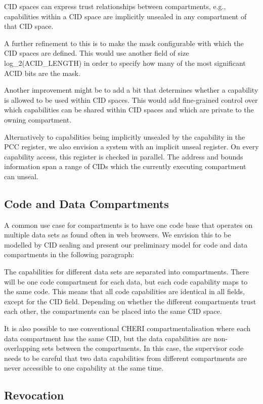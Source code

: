 CID spaces can express trust relationships between compartments, e.g., capabilities within a CID space are implicitly unsealed in any compartment of that CID space.

A further refinement to this is to make the mask configurable with which the CID spaces are defined.
This would use another field of size log\_2(ACID\_LENGTH) in order to specify how many of the most significant ACID bits are the mask.

Another improvement might be to add a bit that determines whether a capability is allowed to be used within CID spaces.
This would add fine-grained control over which capabilities can be shared within CID spaces and which are private to the owning compartment.

Alternatively to capabilities being implicitly unsealed by the capability in the PCC register, we also envision a system with an implicit unseal register.
On every capability access, this register is checked in parallel.
The address and bounds information span a range of CIDs which the currently executing compartment can unseal.

\subsection{Code and Data Compartments}

A common use case for compartments is to have one code base that operates on multiple data sets as found often in web browsers.
We envision this to be modelled by CID sealing and present our preliminary model for code and data compartments in the following paragraph:

The capabilities for different data sets are separated into compartments.
There will be one code compartment for each data, but each code capability maps to the same code.
This means that all code capabilities are identical in all fields, except for the CID field.
Depending on whether the different compartments trust each other, the compartments can be placed into the same CID space.

It is also possible to use conventional CHERI compartmentalisation where each data compartment has the same CID, but the data capabilities are non-overlapping sets between the compartments.
In this case, the supervisor code needs to be careful that two data capabilities from different compartments are never accessible to one capability at the same time.

\subsection{Revocation}

